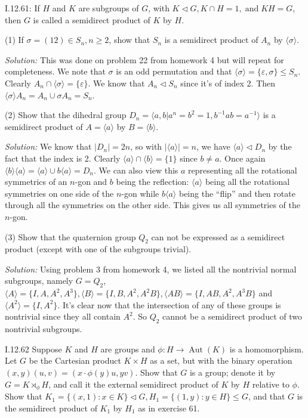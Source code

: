 \documentclass{letter}
\newcommand{\tmem}[1]{{\em #1\/}}
\newcommand{\tmop}[1]{\ensuremath{\operatorname{#1}}}
\begin{document}
I.12.61: If $H$ and $K$ are subgroups of $G$, with $K \vartriangleleft G, K
\cap H = 1, \tmop{and} K H = G$, then $G$ is called a semidirect product of
$K$ by $H$.

(1) If $\sigma = (12) \in S_n, n \geq 2$, show that $S_n$ is a semidirect
product of $A_n$ by $\langle \sigma \rangle$.

{\tmem{Solution:}} This was done on problem 22 from homework 4 but will repeat
for completeness. We note that $\sigma$ is an odd permutation and that
$\langle \sigma \rangle =\{\varepsilon, \sigma\} \leq S_n$. Clearly $A_n \cap
\langle \sigma \rangle =\{\varepsilon\}$. We know that $A_n \vartriangleleft
S_n$ since it's of index 2. Then $\langle \sigma \rangle A_n = A_n \cup \sigma
A_n = S_n$.

(2) Show that the dihedral group $D_n = \langle a, b | a^n = b^2 = 1, b^{- 1}
a b = a^{- 1} \rangle$ is a semidirect product of $A = \langle a \rangle$ by
$B = \langle b \rangle$.

{\tmem{Solution:}} We know that $|D_n | = 2 n$, so with $| \langle a \rangle |
= n$, we have $\langle a \rangle \vartriangleleft D_n$ by the fact that the
index is 2. Clearly $\langle a \rangle \cap \langle b \rangle =\{1\}$ since $b
\neq a$. Once again $\langle b \rangle \langle a \rangle = \langle a \rangle
\cup b \langle a \rangle = D_n$. We can also view this $a$ representing all
the rotational symmetrics of an $n$-gon and $b$ being the reflection: $\langle
a \rangle$ being all the rotational symmetries on one side of the $n$-gon
while $b \langle a \rangle$ being the ``flip'' and then rotate through all the
symmetries on the other side. This gives us all symmetries of the $n$-gon.

(3) Show that the quaternion group $Q_2$ can not be expressed as a semidirect
product (except with one of the subgroups trivial).

{\tmem{Solution:}} Using problem 3 from homework 4, we listed all the
nontrivial normal subgroups, namely $G = Q_2$, $\langle A \rangle =\{I, A,
A^2, A^3 \}, \langle B \rangle =\{I, B, A^2, A^2 B\}, \langle A B \rangle
=\{I, A B, A^2, A^3 B\}$ and $\langle A^2 \rangle =\{I, A^2 \}$. It's clear
now that the intersection of any of these groups is nontrivial since they all
contain $A^2$. So $Q_2$ cannot be a semidirect product of two nontrivial
subgroups.

I.12.62 Suppose $K$ and $H$ are groups and $\phi : H \rightarrow \tmop{Aut}
(K)$ is a homomorphism. Let $G$ be the Cartesian product $K \times H$ as a
set, but with the binary operation $(x, y) (u, v) = (x \cdot \phi (y) u, y
v)$. Show that $G$ is a group; denote it by $G = K \rtimes_{\phi} H$, and call
it the external semidirect product of $K$ by $H$ relative to $\phi$. Show that
$K_1 =\{(x, 1) : x \in K\} \vartriangleleft G, H_1 =\{(1, y) : y \in H\} \leq
G$, and that $G$ is the semidirect product of $K_1$ by $H_1$ as in exercise
61.
\end{document}

